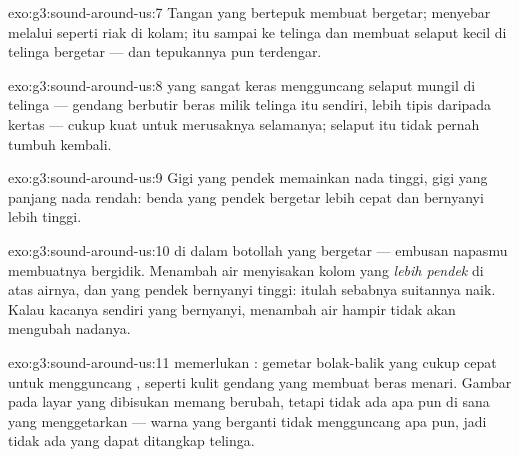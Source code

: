 \begin{solution}{exo:g3:sound-around-us:7}
Tangan yang bertepuk membuat  bergetar;  menyebar
melalui  seperti riak di kolam;  itu sampai ke telinga dan
membuat selaput kecil di telinga bergetar --- dan tepukannya pun
terdengar.
\end{solution}

\begin{solution}{exo:g3:sound-around-us:8}
 yang sangat keras mengguncang selaput mungil di telinga ---
gendang berbutir beras milik telinga itu sendiri, lebih tipis daripada
kertas --- cukup kuat untuk merusaknya selamanya; selaput itu tidak
pernah tumbuh kembali.
\end{solution}

\begin{solution}{exo:g3:sound-around-us:9}
Gigi yang pendek memainkan nada tinggi, gigi yang panjang nada rendah:
benda yang pendek bergetar lebih cepat dan bernyanyi lebih tinggi.
\end{solution}

\begin{solution}{exo:g3:sound-around-us:10}
 di dalam botollah yang bergetar --- embusan napasmu membuatnya
bergidik. Menambah air menyisakan kolom  yang \emph{lebih pendek}
di atas airnya, dan yang pendek bernyanyi tinggi: itulah sebabnya
suitannya naik. Kalau kacanya sendiri yang bernyanyi, menambah air
hampir tidak akan mengubah nadanya.
\end{solution}

\begin{solution}{exo:g3:sound-around-us:11}
 memerlukan \emph{}: gemetar bolak-balik yang cukup cepat
untuk mengguncang , seperti kulit gendang yang membuat beras
menari. Gambar pada layar yang dibisukan memang berubah, tetapi tidak
ada apa pun di sana yang menggetarkan  --- warna yang berganti
tidak mengguncang apa pun, jadi tidak ada yang dapat ditangkap
telinga.
\end{solution}

